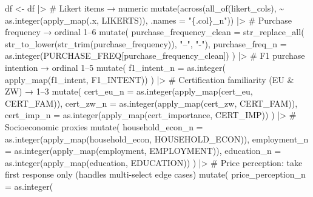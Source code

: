 \documentclass[
  letterpaper,
  DIV=11,
  numbers=noendperiod]{scrartcl}
\newenvironment{Shaded}{\begin{snugshade}}{\end{snugshade}}
\newcommand{\AttributeTok}[1]{\textcolor[rgb]{0.40,0.45,0.13}{#1}}
\newcommand{\CommentTok}[1]{\textcolor[rgb]{0.37,0.37,0.37}{#1}}
\newcommand{\FunctionTok}[1]{\textcolor[rgb]{0.28,0.35,0.67}{#1}}
\newcommand{\NormalTok}[1]{\textcolor[rgb]{0.00,0.23,0.31}{#1}}
\newcommand{\OtherTok}[1]{\textcolor[rgb]{0.00,0.23,0.31}{#1}}
\newcommand{\SpecialCharTok}[1]{\textcolor[rgb]{0.37,0.37,0.37}{#1}}
\newcommand{\StringTok}[1]{\textcolor[rgb]{0.13,0.47,0.30}{#1}}
\begin{document}
\begin{Shaded}
\begin{Highlighting}[]
\NormalTok{df }\OtherTok{\textless{}{-}}\NormalTok{ df }\SpecialCharTok{|\textgreater{}} 
  \CommentTok{\# Likert items → numeric}
  \FunctionTok{mutate}\NormalTok{(}\FunctionTok{across}\NormalTok{(}\FunctionTok{all\_of}\NormalTok{(likert\_cols),}
                \SpecialCharTok{\textasciitilde{}} \FunctionTok{as.integer}\NormalTok{(}\FunctionTok{apply\_map}\NormalTok{(.x, LIKERTS)),}
                \AttributeTok{.names =} \StringTok{"\{.col\}\_n"}\NormalTok{)) }\SpecialCharTok{|\textgreater{}}
  \CommentTok{\# Purchase frequency → ordinal 1–6}
  \FunctionTok{mutate}\NormalTok{(}
    \AttributeTok{purchase\_frequency\_clean =} \FunctionTok{str\_replace\_all}\NormalTok{(}
      \FunctionTok{str\_to\_lower}\NormalTok{(}\FunctionTok{str\_trim}\NormalTok{(purchase\_frequency)), }\StringTok{"–"}\NormalTok{, }\StringTok{"{-}"}\NormalTok{),}
    \AttributeTok{purchase\_freq\_n =} \FunctionTok{as.integer}\NormalTok{(PURCHASE\_FREQ[purchase\_frequency\_clean])}
\NormalTok{  ) }\SpecialCharTok{|\textgreater{}}
  \CommentTok{\# F1 purchase intention → ordinal 1–5}
  \FunctionTok{mutate}\NormalTok{(}
    \AttributeTok{f1\_intent\_n =} \FunctionTok{as.integer}\NormalTok{(}
      \FunctionTok{apply\_map}\NormalTok{(f1\_intent, F1\_INTENT))}
\NormalTok{  ) }\SpecialCharTok{|\textgreater{}}
  \CommentTok{\# Certification familiarity (EU \& ZW) → 1–3}
  \FunctionTok{mutate}\NormalTok{(}
    \AttributeTok{cert\_eu\_n    =} \FunctionTok{as.integer}\NormalTok{(}\FunctionTok{apply\_map}\NormalTok{(cert\_eu, CERT\_FAM)),}
    \AttributeTok{cert\_zw\_n    =} \FunctionTok{as.integer}\NormalTok{(}\FunctionTok{apply\_map}\NormalTok{(cert\_zw, CERT\_FAM)),}
    \AttributeTok{cert\_imp\_n   =} \FunctionTok{as.integer}\NormalTok{(}\FunctionTok{apply\_map}\NormalTok{(cert\_importance, CERT\_IMP))}
\NormalTok{  ) }\SpecialCharTok{|\textgreater{}}
  \CommentTok{\# Socioeconomic proxies}
  \FunctionTok{mutate}\NormalTok{(}
    \AttributeTok{household\_econ\_n =} \FunctionTok{as.integer}\NormalTok{(}\FunctionTok{apply\_map}\NormalTok{(household\_econ, HOUSEHOLD\_ECON)),}
    \AttributeTok{employment\_n     =} \FunctionTok{as.integer}\NormalTok{(}\FunctionTok{apply\_map}\NormalTok{(employment, EMPLOYMENT)),}
    \AttributeTok{education\_n      =} \FunctionTok{as.integer}\NormalTok{(}\FunctionTok{apply\_map}\NormalTok{(education, EDUCATION))}
\NormalTok{  ) }\SpecialCharTok{|\textgreater{}}
  \CommentTok{\# Price perception: take first response only (handles multi{-}select edge cases)}
  \FunctionTok{mutate}\NormalTok{(}
    \AttributeTok{price\_perception\_n =} \FunctionTok{as.integer}\NormalTok{(}

\end{Highlighting}
\end{Shaded}
\end{document}
